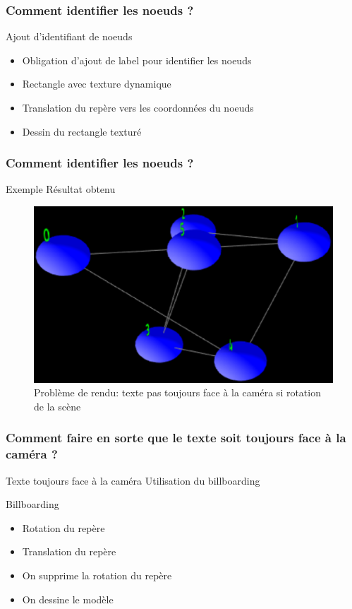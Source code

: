 \documentclass[handout]{beamer}
\begin{document}
\begin{frame}
  \frametitle{Comment identifier les noeuds ?}

  \begin{block}{Ajout d'identifiant de noeuds}
    \begin{itemize}
    \item Obligation d'ajout de label pour identifier les noeuds
    \item Rectangle avec texture dynamique
    \item Translation du repère vers les coordonnées du noeuds
    \item Dessin du rectangle texturé
    \end{itemize}
  \end{block}
\end{frame}

\begin{frame}
  \frametitle{Comment identifier les noeuds ?}
  \begin{block}{Exemple}
    Résultat obtenu
  \end{block}

  \begin{figure}[h]
    \begin{center}
      \includegraphics[scale=0.3]{contents/tnode}
    \end{center}
    \caption{Problème de rendu: texte pas toujours face à la caméra si rotation de la scène}
    \label{fig:tnode}
  \end{figure}
\end{frame}

\begin{frame}
  \frametitle{Comment faire en sorte que le texte soit toujours face à la caméra ?}
  \begin{block}{Texte toujours face à la caméra}
    Utilisation du billboarding
  \end{block}

  \begin{block}{Billboarding}
    \begin{itemize}
    \item Rotation du repère
    \item Translation du repère
    \item On supprime la rotation du repère
    \item On dessine le modèle
    \end{itemize}
  \end{block}
\end{frame}
\end{document}
